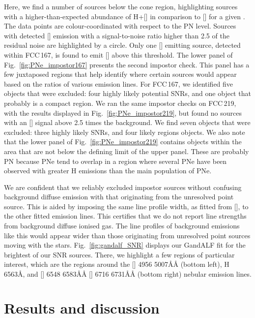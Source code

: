 \documentclass{aa}
\begin{document}
Here, we find a number of sources below the cone region, highlighting sources with a higher-than-expected abundance of H+[] in comparison to [] for a given . The data points are colour-coordinated with respect to the PN  level. Sources with detected [] emission with a signal-to-noise ratio higher than 2.5 of the residual noise are highlighted by a circle. Only one [] emitting source, detected within FCC\,167, is found to emit [] above this threshold. The lower panel of Fig.~\ref{fig:PNe_impostor167} presents the second impostor check. This panel has a few juxtaposed regions that help identify where certain sources would appear based on the ratios of various emission lines. For FCC\,167, we identified five objects that were excluded: four highly likely potential SNRs, and one object that probably is a compact  region.
We ran the same impostor checks on FCC\,219, with the results displayed in Fig.~\ref{fig:PNe_impostor219}, but found no sources with an [] signal above 2.5 times the background. We find seven objects that were excluded: three highly likely SNRs, and four likely  regions objects. We also note that the lower panel of Fig.~\ref{fig:PNe_impostor219} contains objects within the  area that are not below the defining limit of the upper panel. These are probably PN because PNe tend to overlap in a region where several PNe have been observed with greater H emissions than the main population of PNe.

We are confident that we reliably excluded impostor sources without confusing background diffuse emission with that originating from the unresolved point source. This is aided by imposing the same line profile width, as fitted from [], to the other fitted emission lines. This certifies that we do not report line strengths from background diffuse ionised gas. The line profiles of background emissions like this would appear wider than those originating from unresolved point sources moving with the stars.
Fig.~\ref{fig:gandalf_SNR} displays our GandALF fit for the brightest of our SNR sources. There, we highlight a few regions of particular interest, which are the regions around the [] 4956 5007\AA \AA{} (bottom left), H 6563\AA{}, and [] 6548 6583\AA{}\AA{} [] 6716 6731\AA{}\AA{} (bottom right) nebular emission lines.




\section{Results and discussion}
\end{document}
